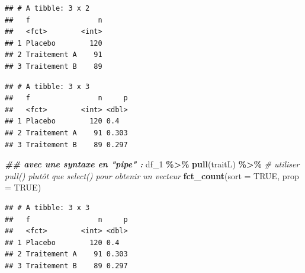 \documentclass[
]{book}
\newenvironment{Shaded}{\begin{snugshade}}{\end{snugshade}}
\newcommand{\AttributeTok}[1]{\textcolor[rgb]{0.13,0.29,0.53}{#1}}
\newcommand{\CommentTok}[1]{\textcolor[rgb]{0.56,0.35,0.01}{\textit{#1}}}
\newcommand{\ConstantTok}[1]{\textcolor[rgb]{0.56,0.35,0.01}{#1}}
\newcommand{\DocumentationTok}[1]{\textcolor[rgb]{0.56,0.35,0.01}{\textbf{\textit{#1}}}}
\newcommand{\FunctionTok}[1]{\textcolor[rgb]{0.13,0.29,0.53}{\textbf{#1}}}
\newcommand{\NormalTok}[1]{#1}
\newcommand{\SpecialCharTok}[1]{\textcolor[rgb]{0.81,0.36,0.00}{\textbf{#1}}}
\begin{document}
\begin{verbatim}
## # A tibble: 3 x 2
##   f                n
##   <fct>        <int>
## 1 Placebo        120
## 2 Traitement A    91
## 3 Traitement B    89
\end{verbatim}

\begin{Shaded}
\end{Shaded}

\begin{verbatim}
## # A tibble: 3 x 3
##   f                n     p
##   <fct>        <int> <dbl>
## 1 Placebo        120 0.4  
## 2 Traitement A    91 0.303
## 3 Traitement B    89 0.297
\end{verbatim}

\begin{Shaded}
\begin{Highlighting}[]
\DocumentationTok{\#\# avec une syntaxe en "pipe" :}
\NormalTok{df\_1 }\SpecialCharTok{\%\textgreater{}\%}
  \FunctionTok{pull}\NormalTok{(traitL) }\SpecialCharTok{\%\textgreater{}\%} \CommentTok{\# utiliser pull() plutôt que select() pour obtenir un vecteur}
  \FunctionTok{fct\_count}\NormalTok{(}\AttributeTok{sort =} \ConstantTok{TRUE}\NormalTok{, }\AttributeTok{prop =} \ConstantTok{TRUE}\NormalTok{)}
\end{Highlighting}
\end{Shaded}

\begin{verbatim}
## # A tibble: 3 x 3
##   f                n     p
##   <fct>        <int> <dbl>
## 1 Placebo        120 0.4  
## 2 Traitement A    91 0.303
## 3 Traitement B    89 0.297
\end{verbatim}
\end{document}
